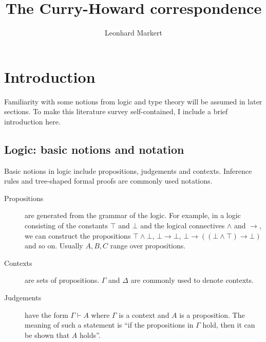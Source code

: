\documentclass[12pt,toc=bibliography,numbers=noendperiod,
               footnotes=multiple,twoside]{scrartcl}
\title{The Curry-Howard correspondence}
\author{Leonhard Markert}
\date{}
\begin{document}
\thispagestyle{empty}
\maketitle


\vspace{10pt}
\makeatletter
{}
\makeatother
\newpage

\section{Introduction}

Familiarity with some notions from logic and type theory will be assumed in later sections. To make this literature survey self-contained, I include a brief introduction here.

\subsection{Logic: basic notions and notation}

Basic notions in logic include propositions, judgements and contexts. Inference rules and tree-shaped formal proofs are commonly used notations.

\begin{description}
\item[Propositions] are generated from the grammar of the logic. For example, in a logic consisting of the constants \(\top\) and \(\bot\) and the logical connectives \(\wedge\) and \(\rightarrow\), we can construct the propositions \(\top \wedge \bot\), \(\bot \rightarrow \bot\), \(\bot \rightarrow ((\bot \wedge \top) \rightarrow \bot)\) and so on. Usually \(A, B, C\) range over propositions.
\item[Contexts] are sets of propositions. \(\Gamma\) and \(\Delta\) are commonly used to denote contexts.
\item[Judgements] have the form \(\Gamma \vdash A\) where \(\Gamma\) is a context and \(A\) is a proposition. The meaning of such a statement is \enquote{if the propositions in \(\Gamma\) hold, then it can be shown that \(A\) holds}.
\end{description}
\end{document}
